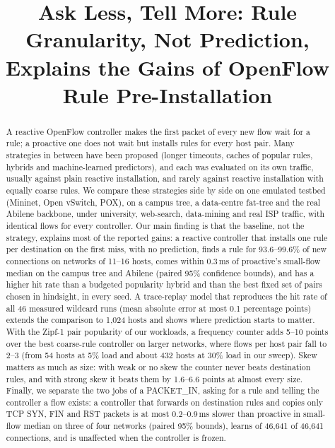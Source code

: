 \documentclass[conference]{IEEEtran}
\begin{document}
\title{Ask Less, Tell More: Rule Granularity, Not Prediction,\\Explains the Gains of OpenFlow Rule Pre-Installation}

\author{
}

\maketitle

\begin{abstract}
A reactive OpenFlow controller makes the first packet of every new flow wait for a rule; a proactive one does not wait but installs rules for every host pair. Many strategies in between have been proposed (longer timeouts, caches of popular rules, hybrids and machine-learned predictors), and each was evaluated on its own traffic, usually against plain reactive installation, and rarely against reactive installation with equally coarse rules. We compare these strategies side by side on one emulated testbed (Mininet, Open vSwitch, POX), on a campus tree, a data-centre fat-tree and the real Abilene backbone, under university, web-search, data-mining and real ISP traffic, with identical flows for every controller. Our main finding is that the baseline, not the strategy, explains most of the reported gains: a reactive controller that installs one rule per destination on the first miss, with no prediction, finds a rule for 93.6--99.6\% of new connections on networks of 11--16 hosts, comes within 0.3\,ms of proactive's small-flow median on the campus tree and Abilene (paired 95\% confidence bounds), and has a higher hit rate than a budgeted popularity hybrid and than the best fixed set of pairs chosen in hindsight, in every seed. A trace-replay model that reproduces the hit rate of all 46 measured wildcard runs (mean absolute error at most 0.1 percentage points) extends the comparison to 1,024 hosts and shows where prediction starts to matter. With the Zipf-1 pair popularity of our workloads, a frequency counter adds 5--10 points over the best coarse-rule controller on larger networks, where flows per host pair fall to 2--3 (from 54 hosts at 5\% load and about 432 hosts at 30\% load in our sweep). Skew matters as much as size: with weak or no skew the counter never beats destination rules, and with strong skew it beats them by 1.6--6.6 points at almost every size. Finally, we separate the two jobs of a PACKET\_IN, asking for a rule and telling the controller a flow exists: a controller that forwards on destination rules and copies only TCP SYN, FIN and RST packets is at most 0.2--0.9\,ms slower than proactive in small-flow median on three of four networks (paired 95\% bounds), learns of 46,641 of 46,641 connections, and is unaffected when the controller is frozen.
\end{abstract}
\end{document}
